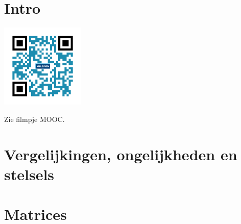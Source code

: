 
\section*{Intro}
\begin{minipage}{.25\linewidth}
	\raggedright
	\includegraphics[width=4cm]{5_vglen_ongelijkheden_stelsels_matrices/inputs/QR_Code_INTRO_module5}
\end{minipage}
\begin{minipage}{.7\linewidth}
	Zie filmpje MOOC.
\end{minipage}

\section{Vergelijkingen, ongelijkheden en stelsels}



\section{Matrices}


